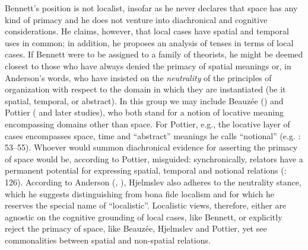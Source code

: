 \documentclass[output=paper]{langscibook}
\begin{document}
Bennett’s position is not localist, insofar as he never declares that space has any kind of primacy and he does not venture into diachronical and cognitive considerations. He claims, however, that local cases have spatial and temporal uses in common; in addition, he proposes an analysis of tenses in terms of local cases. If Bennett were to be assigned to a family of theorists, he might be deemed closest to those who have always denied the primacy of spatial meanings or, in Anderson’s words, who have insisted on the \textit{neutrality} of the principles of organization with respect to the domain in which they are instantiated (be it spatial, temporal, or abstract). In this group we may include Beauzée (\citeyear{beauzee_preposition_1786}) and Pottier (\citeyear{pottier_systematique_1962} and later studies), who both stand for a notion of locative meaning encompassing domains other than space. For Pottier, e.g., the locative layer of cases encompasses space, time and “abstract” meanings he calls “notional” (e.g. \citealt{pottier_linguistique_1974}: 53--55). Whoever would summon diachronical evidence for asserting the primacy of space would be, according to Pottier, misguided: synchronically, relators have a permanent potential for expressing spatial, temporal and notional relations (\citealt{pottier_systematique_1962}: 126). According to Anderson (\citeyear{anderson_grammar_1971}, \citeyear{anderson_localism_1994}), Hjelmslev also adheres to the neutrality stance, which he suggests distinguishing from bona fide localism and for which he reserves the special name of “localistic”. Localistic views, therefore, either are agnostic on the cognitive grounding of local cases, like Bennett, or explicitly reject the primacy of space, like Beauzée, Hjelmslev and Pottier, yet see commonalities between spatial and non-spatial relations.
\end{document}
